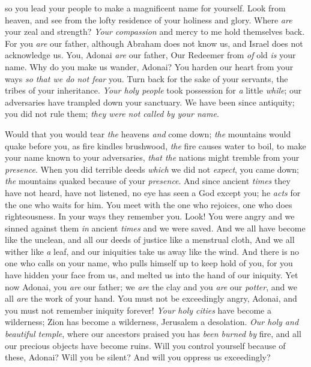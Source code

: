\begin{biblechapter}
so you lead your people to make a magnificent name for yourself.
 Look from heaven, 
and see from the lofty residence of your holiness and glory. 
Where \textit{are} your zeal and strength? 
\textit{Your compassion} and mercy to me hold themselves back.
\verse For you \textit{are} our father, although Abraham does not know us, 
and Israel does not acknowledge us. 
You, Adonai \textit{are} our father, 
Our Redeemer from \textit{of} old \textit{is} your name.
\verse Why do you make us wander, Adonai? 
You harden our heart from your ways \textit{so that we do not fear} you. 
Turn back for the sake of your servants, 
the tribes of your inheritance.
\verse \textit{Your holy people} took possession for \textit{a} little \textit{while}; 
our adversaries have trampled down your sanctuary.
\verse We have been since antiquity; you did not rule them; 
\textit{they were not called by your name}.
\end{biblechapter}

\begin{biblechapter} %
\verse  Would that you would tear \textit{the} heavens \textit{and} come down; 
\textit{the} mountains would quake before you,
\verse  as fire kindles brushwood, 
\textit{the} fire causes water to boil, 
to make your name known to your adversaries, 
\textit{that the} nations might tremble from your \textit{presence}.
\verse When you did terrible deeds \textit{which} we did not \textit{expect}, you came down; 
\textit{the} mountains quaked because of your \textit{presence}.
\verse And since ancient \textit{times} they have not heard, 
have not listened, 
no eye has seen a God except you; 
he \textit{acts} for the one who waits for him.
\verse You meet with the one who rejoices, 
one who does righteousness. 
In your ways they remember you. 
Look! You were angry and we sinned against them \textit{in} ancient \textit{times} and we were saved.
\verse And we all have become like the unclean, 
and all our deeds of justice like a menstrual cloth, 
And we all wither like \textit{a} leaf, 
and our iniquities take us away like the wind.
\verse And there is no one who calls on your name, 
who pulls himself up to keep hold of you, 
for you have hidden your face from us, 
and melted us into the hand of our iniquity.
\verse Yet now Adonai, you \textit{are} our father; 
we \textit{are} the clay and you \textit{are} our \textit{potter}, 
and we all \textit{are} the work of your hand.
\verse You must not be exceedingly angry, Adonai, 
and you must not remember iniquity forever!
\verse \textit{Your holy cities} have become a wilderness; 
Zion has become a wilderness, Jerusalem a desolation.
\verse \textit{Our holy and beautiful temple}, where our ancestors praised you has \textit{been burned} \textit{by} fire, 
and all our precious objects have become ruins.
\verse Will you control yourself because of these, Adonai? 
Will you be silent? 
And will you oppress us exceedingly?
\end{biblechapter}

